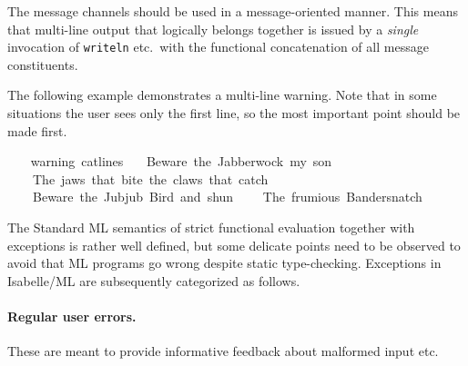 \begin{isabellebody}
\begin{isamarkuptext}
  \begin{warn}
  The message channels should be used in a message-oriented manner.
  This means that multi-line output that logically belongs together is
  issued by a \emph{single} invocation of \verb|writeln| etc.\ with the
  functional concatenation of all message constituents.
  \end{warn}%
\end{isamarkuptext}%
\isamarkuptrue%
%
\endisatagmlref
{\isafoldmlref}%
%
\isadelimmlref
%
\endisadelimmlref
%
\isadelimmlex
%
\endisadelimmlex
%
\isatagmlex
%
\begin{isamarkuptext}%
The following example demonstrates a multi-line
  warning.  Note that in some situations the user sees only the first
  line, so the most important point should be made first.%
\end{isamarkuptext}%
\isamarkuptrue%
%
\endisatagmlex
{\isafoldmlex}%
%
\isadelimmlex
%
\endisadelimmlex
%
\isadelimML
%
\endisadelimML
%
\isatagML
{}\isamarkupfalse%
\ {\isacharverbatimopen}\isanewline
\ \ warning\ {\isacharparenleft}cat{\isacharunderscore}lines\isanewline
\ \ \ {\isacharbrackleft}{\isachardoublequote}Beware\ the\ Jabberwock{\isacharcomma}\ my\ son{\isacharbang}{\isachardoublequote}{\isacharcomma}\isanewline
\ \ \ \ {\isachardoublequote}The\ jaws\ that\ bite{\isacharcomma}\ the\ claws\ that\ catch{\isacharbang}{\isachardoublequote}{\isacharcomma}\isanewline
\ \ \ \ {\isachardoublequote}Beware\ the\ Jubjub\ Bird{\isacharcomma}\ and\ shun{\isachardoublequote}{\isacharcomma}\isanewline
\ \ \ \ {\isachardoublequote}The\ frumious\ Bandersnatch{\isacharbang}{\isachardoublequote}{\isacharbrackright}{\isacharparenright}{\isacharsemicolon}\isanewline
{\isacharverbatimclose}%
\endisatagML
{\isafoldML}%
%
\isadelimML
%
\endisadelimML
%
\isamarkuptrue%
%
\begin{isamarkuptext}%
The Standard ML semantics of strict functional evaluation
  together with exceptions is rather well defined, but some delicate
  points need to be observed to avoid that ML programs go wrong
  despite static type-checking.  Exceptions in Isabelle/ML are
  subsequently categorized as follows.

  \paragraph{Regular user errors.}  These are meant to provide
  informative feedback about malformed input etc.


\end{isamarkuptext}
\end{isabellebody}
